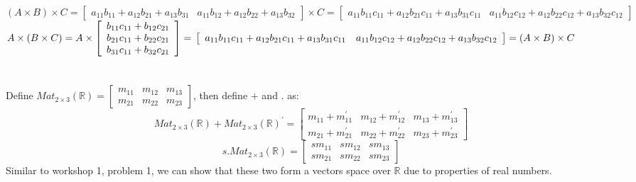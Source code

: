 \documentclass{article}
\begin{document}
\section{}
$(A\times B)\times C = \left[\begin{array}{cc}a_{11} b_{11} + a_{12} b_{21} + a_{13} b_{31} & a_{11} b_{12} + a_{12} b_{22} + a_{13} b_{32}\end{array}\right] \times C = \left[\begin{array}{cc}a_{11} b_{11} c_{11}+ a_{12} b_{21} c_{11}+ a_{13} b_{31} c_{11} & a_{11} b_{12} c_{12}+ a_{12} b_{22} c_{12}+ a_{13} b_{32} c_{12}\end{array}\right]$\newline
$A\times (B\times C) = A \times \left[\begin{array}{c} b_{11} c_{11} + b_{12} c_{21}\\b_{21} c_{11} + b_{22} c_{21} \\ b_{31} c_{11} + b_{32} c_{21}\end{array}\right] = \\ \left[\begin{array}{cc}a_{11} b_{11} c_{11}+ a_{12} b_{21} c_{11}+ a_{13} b_{31} c_{11} & a_{11} b_{12} c_{12}+ a_{12} b_{22} c_{12}+ a_{13} b_{32} c_{12}\end{array}\right] = \\(A\times B)\times C$
\section{}
\subsection{}
Define $Mat_{2\times 3}(\mathbb{R}) = \left[\begin{array}{ccc} m_{11} & m_{12} & m_{13} \\  m_{21} & m_{22} & m_{23}\end{array}\right]$, then define $+$ and $.$ as:\newline
$$Mat_{2\times 3}(\mathbb{R}) + Mat_{2\times 3}(\mathbb{R})^{'} =\left[\begin{array}{ccc} m_{11}+m_{11}^{'} & m_{12}+m_{12}^{'} & m_{13}+m_{13}^{'} \\  m_{21}+m_{21}^{'} & m_{22}+m_{22}^{'} & m_{23}+m_{23}^{'}\end{array}\right] $$
$$s . Mat_{2\times 3}(\mathbb{R}) = \left[\begin{array}{ccc} sm_{11} & sm_{12} & sm_{13} \\  sm_{21} & sm_{22} & sm_{23}\end{array}\right]$$
Similar to workshop 1, problem 1, we can show that these two form a vectors space over $\mathbb{R}$ due to properties of real numbers.
\end{document}
